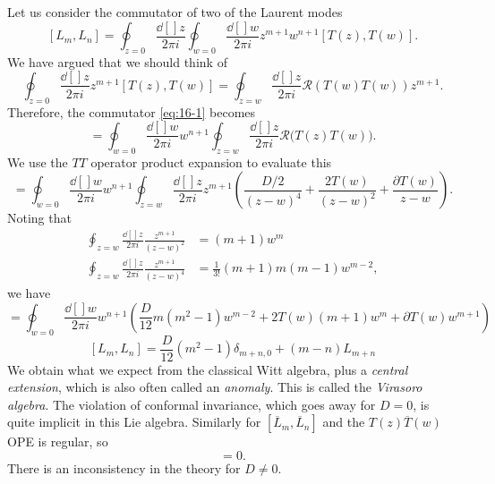 
Let us consider the commutator of two of the Laurent modes
\begin{equation}
  \label{eq:16-1}
  [L_m, L_n] = \oint_{z = 0} \frac{\dd[]{z}}{2 \pi i} \oint_{w =0} \frac{\dd[]{w}}{2 \pi i} z^{m + 1} w^{n + 1} [T(z), T(w)].
\end{equation}
We have argued that we should think of
\begin{equation}
  \oint_{z = 0} \frac{\dd[]{z}}{2 \pi i} z^{m+1} [T(z), T(w)] = \oint_{z = w} \frac{\dd[]{z}}{2 \pi i } \mathcal{R}(T(w) T(w)) z^{m + 1}.
\end{equation}
Therefore, the commutator \eqref{eq:16-1} becomes
\begin{equation}
  [L_m, L_n] = \oint_{w = 0} \frac{\dd[]{w}}{2 \pi i} w^{n+1} \oint_{z = w} \frac{\dd[]{z}}{2 \pi i } \mathcal{R} \bigl( T(z) T(w) \bigr).
\end{equation}
We use the $TT$ operator product expansion to evaluate this
\begin{equation}
  [L_m, L_n] = \oint_{w = 0} \frac{\dd[]{w}}{2 \pi i} w^{n + 1} \oint_{z = w} \frac{\dd[]{z}}{2 \pi i} z^{m+ 1} \left( \frac{D/2}{(z - w)^4} + \frac{2 T(w)}{(z - w)^2} + \frac{\partial T(w)}{z - w} \right).
\end{equation}
Noting that
\begin{align}
  \oint_{z = w} \frac{\dd[]{z}}{2 \pi i} \frac{z^{m+1}}{(z - w)^2} &= (m+1) w^m \\
  \oint_{z = w} \frac{\dd[]{z}}{2 \pi i} \frac{z^{m+1}}{(z - w)^4} &= \frac{1}{3!} (m+1) m (m-1) w^{m-2},
\end{align}
we have
\begin{equation}
  [L_m, L_n] = \oint_{w = 0} \frac{\dd[]{w}}{2 \pi i} w^{n+1} \left( \frac{D}{12} m(m^2 - 1) w^{m-2} + 2T(w) (m+1) w^m + \partial T(w) w^{m+1} \right)
\end{equation}
\begin{equation}
  \boxed{[L_m, L_n] = \frac{D}{12}  (m^2 - 1) \delta_{m+ n, 0} + (m-n) L_{m+n}}
\end{equation}
We obtain what we expect from the classical Witt algebra, plus a \emph{central extension}, which is also often called an \emph{anomaly}.
This is called the \emph{Virasoro algebra}.
The violation of conformal invariance, which goes away for $D = 0$, is quite implicit in this Lie algebra.
Similarly for $[\overline{L}{}_m, \overline{L}{}_n]$ and the $T(z) \overline{T}{}(w)$ OPE is regular, so 
\begin{equation}
  [L_m, \overline{L}{}_n] = 0.
\end{equation}
There is an inconsistency in the theory for $D \neq 0$. 

